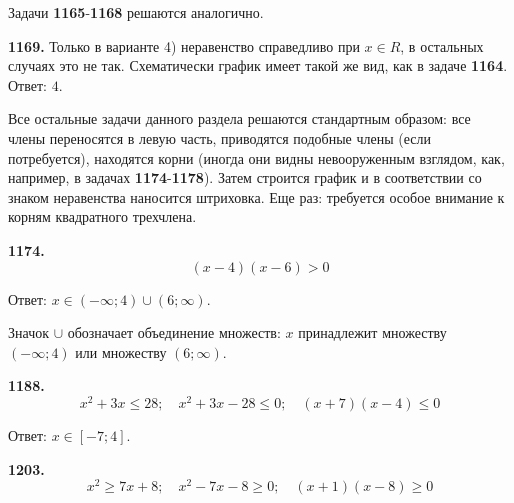 Задачи \textbf{1165}-\textbf{1168} решаются аналогично.

\textbf{1169.}  Только в варианте 4) неравенство справедливо при $x\in R$, в остальных случаях это не так. Схематически график имеет такой же вид, как в задаче \textbf{1164}. \newline \null \hspace*{\fill} Ответ: $4$. 

Все остальные задачи данного раздела решаются стандартным образом: все члены переносятся в левую часть, приводятся подобные члены (если потребуется), находятся корни (иногда они видны невооруженным взглядом, как, например, в задачах \textbf{1174}-\textbf{1178}). Затем строится график и в соответствии со знаком неравенства наносится штриховка. Еще раз: требуется особое внимание к корням квадратного трехчлена. 

\textbf{1174.} $$(x-4)(x-6)>0$$                 

\begin{figure}[h!]
\end{figure}

\null \hspace*{\fill} Ответ: $x\in(-\infty;4)\cup(6;\infty)$.

Значок $\cup$ обозначает объединение множеств: $x$ принадлежит множеству $(-\infty;4)$ или множеству $(6;\infty)$.
 
\textbf{1188.} $$x^2+3x\leq28;\quad x^2+3x-28\leq0;\quad (x+7)(x-4)\leq0$$ 

\begin{figure}[h!]
\end{figure}

\null \hspace*{\fill} Ответ: $x\in[-7;4]$. 

\textbf{1203.} $$x^2\geq7x+8;\quad x^2-7x-8\geq0;\quad (x+1)(x-8)\geq0$$

\begin{figure}[h!]
\end{figure}

